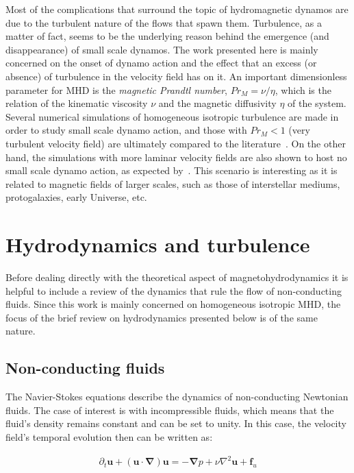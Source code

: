 \documentclass[12pt,a4paper]{report}
\begin{document}
Most of the complications that surround the topic of hydromagnetic dynamos are due to the turbulent nature of the flows that spawn them. Turbulence, as a matter of fact, seems to be the underlying reason behind the emergence (and disappearance) of small scale dynamos. The work presented here is mainly concerned on the onset of dynamo action and the effect that an excess (or absence) of turbulence in the velocity field has on it. An important dimensionless parameter for MHD is the \textit{magnetic Prandtl number}, $Pr_M=\nu/\eta$, which is the relation of the kinematic viscosity $\nu$ and the magnetic diffusivity $\eta$ of the system. Several numerical simulations of homogeneous isotropic turbulence are made in order to study small scale dynamo action, and those with $Pr_M<1$ (very turbulent velocity field) are ultimately compared to the literature~\cite{schekochihin2004critical}. On the other hand, the simulations with more laminar velocity fields are also shown to host no small scale dynamo action, as expected by~\cite{schnack2009lectures}. This scenario is interesting as it is related to magnetic fields of larger scales, such as those of interstellar mediums, protogalaxies, early Universe, etc.~\cite{schekochihin2002small}


\chapter{Hydrodynamics and turbulence}

Before dealing directly with the theoretical aspect of magnetohydrodynamics it is helpful to include a review of the dynamics that rule the flow of non-conducting fluids. Since this work is mainly concerned on homogeneous isotropic MHD, the focus of the brief review on hydrodynamics presented below is of the same nature. 

\section{Non-conducting fluids}

The Navier-Stokes equations describe the dynamics of non-conducting Newtonian fluids. The case of interest is with incompressible fluids, which means that the fluid's density remains constant and can be set to unity. In this case, the velocity field's temporal evolution then can be written as:

\begin{align}
 \partial_t \bm u + (\bm u \cdot \bm \nabla) \bm u = - \bm \nabla p + \nu \nabla^2 \bm u + \bm f_u
 \label{eq2.1}
\end{align}
\end{document}
